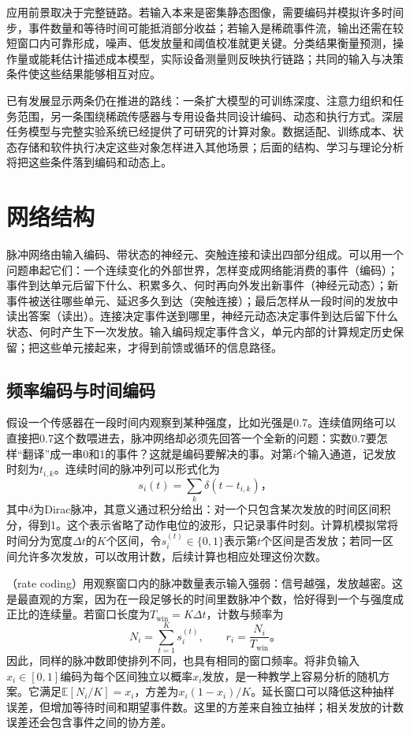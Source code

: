 应用前景取决于完整链路。若输入本来是密集静态图像，需要编码并模拟许多时间步，事件数量和等待时间可能抵消部分收益；若输入是稀疏事件流，输出还需在较短窗口内可靠形成，噪声、低发放量和阈值校准就更关键。分类结果衡量预测，操作量或能耗估计描述成本模型，实际设备测量则反映执行链路；共同的输入与决策条件使这些结果能够相互对应。

已有发展显示两条仍在推进的路线：一条扩大模型的可训练深度、注意力组织和任务范围，另一条围绕稀疏传感器与专用设备共同设计编码、动态和执行方式。深层任务模型与完整实验系统已经提供了可研究的计算对象。数据适配、训练成本、状态存储和软件执行决定这些对象怎样进入其他场景；后面的结构、学习与理论分析将把这些条件落到编码和动态上。

\section{网络结构}
\label{sec:snn-coding-dynamics}

脉冲网络由输入编码、带状态的神经元、突触连接和读出四部分组成。可以用一个问题串起它们：一个连续变化的外部世界，怎样变成网络能消费的事件（编码）；事件到达单元后留下什么、积累多久、何时再向外发出新事件（神经元动态）；新事件被送往哪些单元、延迟多久到达（突触连接）；最后怎样从一段时间的发放中读出答案（读出）。连接决定事件送到哪里，神经元动态决定事件到达后留下什么状态、何时产生下一次发放。输入编码规定事件含义，单元内部的计算规定历史保留；把这些单元接起来，才得到前馈或循环的信息路径。

\subsection{频率编码与时间编码}
\label{sec:snn-coding}

假设一个传感器在一段时间内观察到某种强度，比如光强是0.7。连续值网络可以直接把0.7这个数喂进去，脉冲网络却必须先回答一个全新的问题：实数0.7要怎样“翻译”成一串0和1的事件？这就是编码要解决的事。对第$i$个输入通道，记发放时刻为$t_{i,k}$。连续时间的脉冲列可以形式化为
\begin{equation}
  s_i(t)=\sum_k\delta(t-t_{i,k})\text{，}
  \label{eq:snn-spike-train}
\end{equation}
其中$\delta$为Dirac脉冲，其意义通过积分给出：对一个只包含某次发放的时间区间积分，得到1。这个表示省略了动作电位的波形，只记录事件时刻。计算机模拟常将时间分为宽度$\Delta t$的$K$个区间，令$s_i^{(t)}\in\{0,1\}$表示第$t$个区间是否发放；若同一区间允许多次发放，可以改用计数，后续计算也相应处理这份次数。

（rate coding）用观察窗口内的脉冲数量表示输入强弱：信号越强，发放越密。这是最直观的方案，因为在一段足够长的时间里数脉冲个数，恰好得到一个与强度成正比的连续量。若窗口长度为$T_{\mathrm{win}}=K\Delta t$，计数与频率为
\begin{equation}
  N_i=\sum_{t=1}^{K}s_i^{(t)},\qquad
  r_i=\frac{N_i}{T_{\mathrm{win}}}\text{。}
  \label{eq:snn-rate-code}
\end{equation}
因此，同样的脉冲数即使排列不同，也具有相同的窗口频率。将非负输入$x_i\in[0,1]$编码为每个区间独立以概率$x_i$发放，是一种教学上容易分析的随机方案。它满足$\mathbb E[N_i/K]=x_i$，方差为$x_i(1-x_i)/K$。延长窗口可以降低这种抽样误差，但增加等待时间和期望事件数。这里的方差来自独立抽样；相关发放的计数误差还会包含事件之间的协方差。

